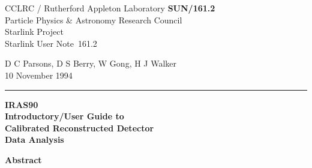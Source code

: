 \documentclass[twoside,11pt]{article}
\newcommand{\stardoccategory}  {Starlink User Note}
\newcommand{\stardocinitials}  {SUN}
\newcommand{\stardocnumber}    {161.2}
\newcommand{\stardocauthors}   {D C Parsons, D S Berry, W Gong, H J Walker}
\newcommand{\stardocdate}      {10 November 1994}
\newcommand{\stardoctitle}     {IRAS90\\[2ex]
                                Introductory/User Guide to\\[2ex] 
                                Calibrated Reconstructed Detector\\[2ex]
                                Data Analysis}
\newcommand{\stardocname}{\stardocinitials /\stardocnumber}
\newenvironment{latexonly}{}{}
\begin{document}
\thispagestyle{empty}

\begin{latexonly}
   CCLRC / {\sc Rutherford Appleton Laboratory} \hfill {\bf \stardocname}\\
   {\large Particle Physics \& Astronomy Research Council}\\
   {\large Starlink Project\\}
   {\large \stardoccategory\ \stardocnumber}
   \begin{flushright}
   \stardocauthors\\
   \stardocdate
   \end{flushright}
   \vspace{-4mm}
   \rule{\textwidth}{0.5mm}
   \vspace{5mm}
   \begin{center}
   {\Huge\bf  \stardoctitle}
   \end{center}
   \vspace{5mm}

   \vspace{10mm}
   \begin{center}
      {\Large\bf Abstract}
   \end{center}
\end{latexonly}
\end{document}
